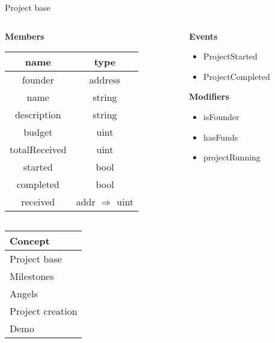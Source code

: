 \documentclass{beamer}
\begin{document}
\begin{frame}{Project base}
\begin{columns}
\begin{column}{0.55\textwidth}
\begin{center}
\textbf{Members}\\
\vspace{3mm}
	\begin{tabular}{c|c}
		name & type \\
		\hline
		 founder & address \\
		 name & string \\
		 description & string \\
		 budget & uint \\
		 totalReceived & uint \\
		 started & bool \\
		 completed & bool \\
		 received & addr $\Rightarrow$ uint \\
	\end{tabular}
\end{center}
\end{column}
\begin{column}{0.45\textwidth}
\begin{center}
\textbf{Events}\\
\vspace{1mm}
\begin{itemize}
	\item ProjectStarted
	\item ProjectCompleted
\end{itemize}
\vspace{8mm}
\textbf{Modifiers}\\
\vspace{1mm}
\begin{itemize}
	\item isFounder
	\item hasFunds
	\item projectRunning
\end{itemize}
\end{center}
\end{column}
\end{columns}
\end{frame}


\begin{frame}
	\begin{tabularx}{\textwidth}{X}
		\hline
		Concept\\
		\hline
		Project base\\
		\hline
		\rowcolor{hcolor}
		Milestones\\
		\hline
		Angels\\
		\hline
		Project creation\\
		\hline
		Demo\\
		\hline
	\end{tabularx}
\end{frame}
\end{document}
